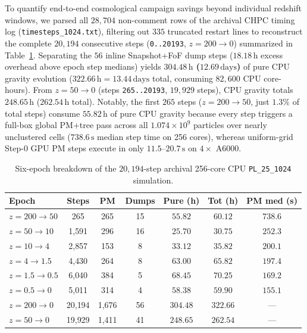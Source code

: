 \documentclass[aps,prd,reprint,superscriptaddress,nofootinbib,amsmath,amssymb,floatfix,longbibliography]{revtex4-2}
\begin{document}
To quantify end-to-end cosmological campaign savings beyond individual redshift windows, we parsed all $28{,}704$ non-comment rows of the archival CHPC timing log (\texttt{timesteps\_1024.txt}), filtering out $335$ truncated restart lines to reconstruct the complete $20{,}194$ consecutive steps (\texttt{0..20193}, $z = 200 \rightarrow 0$) summarized in Table~\ref{tab:epochs}. Separating the $56$ inline Snapshot+FoF dump steps ($18.18\,\mathrm{h}$ excess overhead above epoch step medians) yields \textbf{$304.48\,\mathrm{h}$ ($12.69\,\mathrm{days}$)} of pure CPU gravity evolution ($322.66\,\mathrm{h} = 13.44\,\mathrm{days}$ total, consuming $82{,}600$ CPU core-hours). From $z = 50 \rightarrow 0$ (steps \texttt{265..20193}, $19{,}929$ steps), CPU gravity totals $248.65\,\mathrm{h}$ ($262.54\,\mathrm{h}$ total). Notably, the first $265$ steps ($z = 200 \rightarrow 50$, just $1.3\%$ of total steps) consume $55.82\,\mathrm{h}$ of pure CPU gravity because every step triggers a full-box global PM+tree pass across all $1.074 \times 10^9$ particles over nearly unclustered cells ($738.6\,\mathrm{s}$ median step time on 256 cores), whereas uniform-grid Step-0 GPU PM steps execute in only $11.5$--$20.7\,\mathrm{s}$ on $4\times$ A6000.

\begin{table}[!tbp]
\caption{Six-epoch breakdown of the $20{,}194$-step archival 256-core CPU \texttt{PL\_25\_1024} simulation.}\label{tab:epochs}
\scriptsize
\setlength{\tabcolsep}{2.5pt}
\begin{ruledtabular}
\begin{tabular}{lcccccc}
Epoch & Steps & PM & Dumps & Pure (h) & Tot (h) & PM med (s) \\
\hline
$z = 200 \rightarrow 50$ & 265   & 265 & 15 & $55.82$ & $60.12$ & $738.6$ \\
$z = 50 \rightarrow 10$  & 1{,}591 & 296 & 16 & $25.70$ & $30.75$ & $252.3$ \\
$z = 10 \rightarrow 4$   & 2{,}857 & 153 & 8  & $33.12$ & $35.82$ & $200.1$ \\
$z = 4 \rightarrow 1.5$  & 4{,}430 & 264 & 8  & $63.00$ & $65.82$ & $197.4$ \\
$z = 1.5 \rightarrow 0.5$& 6{,}040 & 384 & 5  & $68.45$ & $70.25$ & $169.2$ \\
$z = 0.5 \rightarrow 0$  & 5{,}011 & 314 & 4  & $58.38$ & $59.90$ & $155.1$ \\
\hline
$z = 200 \rightarrow 0$ & 20{,}194 & 1{,}676 & 56 & $304.48$ & $322.66$ & --- \\
$z = 50 \rightarrow 0$  & 19{,}929 & 1{,}411 & 41 & $248.65$ & $262.54$ & --- \\
\end{tabular}
\end{ruledtabular}
\end{table}
\end{document}
